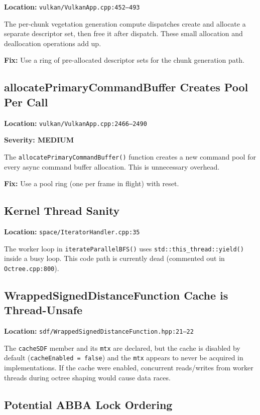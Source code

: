 \documentclass[a4paper,11pt]{article}
\begin{document}
\textbf{Location:} \texttt{vulkan/VulkanApp.cpp:452--493}

The per-chunk vegetation generation compute dispatches create and allocate a
separate descriptor set, then free it after dispatch. These small allocation
and deallocation operations add up.

\textbf{Fix:} Use a ring of pre-allocated descriptor sets for the chunk
generation path.

\subsection{allocatePrimaryCommandBuffer Creates Pool Per Call}

\textbf{Location:} \texttt{vulkan/VulkanApp.cpp:2466--2490}

\textbf{Severity: MEDIUM}

The \texttt{allocatePrimary\-CommandBuffer()} function creates a new
command pool for every async command buffer allocation. This is
unnecessary overhead.

\textbf{Fix:} Use a pool ring (one per frame in flight) with reset.

\subsection{Kernel Thread Sanity}

\textbf{Location:} \texttt{space/IteratorHandler.cpp:35}

The worker loop in \texttt{iterateParallelBFS()} uses
\texttt{std::this\_thread::yield()} inside a busy loop. This code path is
currently dead (commented out in \texttt{Octree.cpp:800}).

\subsection{WrappedSignedDistanceFunction Cache is Thread-Unsafe}

\textbf{Location:} \texttt{sdf/WrappedSignedDistanceFunction.hpp:21--22}

The \texttt{cacheSDF} member and its \texttt{mtx} are declared, but the
cache is disabled by default (\texttt{cacheEnabled = false}) and the
\texttt{mtx} appears to never be acquired in implementations. If the cache
were enabled, concurrent reads/writes from worker threads during octree
shaping would cause data races.

\subsection{Potential ABBA Lock Ordering}
\end{document}
